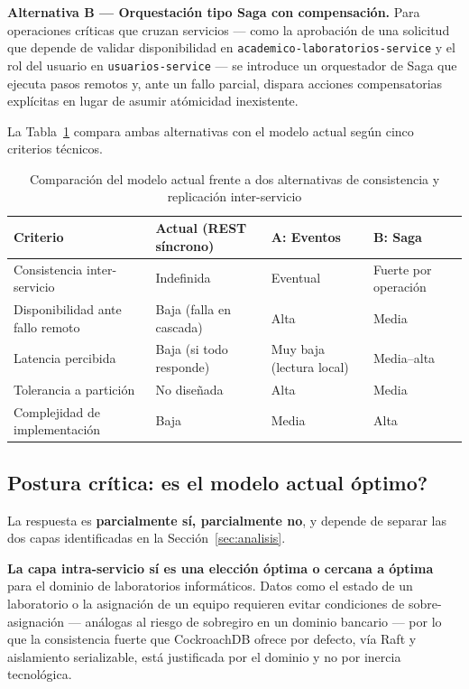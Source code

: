 \documentclass[12pt,letterpaper]{article}
\begin{document}
\textbf{Alternativa B --- Orquestaci\'on tipo Saga con compensaci\'on.}
Para operaciones cr\'iticas que cruzan servicios --- como la aprobaci\'on
de una solicitud que depende de validar disponibilidad en
\texttt{academico-laboratorios-service} y el rol del usuario en
\texttt{usuarios-service} --- se introduce un orquestador de Saga que
ejecuta pasos remotos y, ante un fallo parcial, dispara acciones
compensatorias expl\'icitas en lugar de asumir at\'omicidad inexistente.

La Tabla~\ref{tab:alternativas} compara ambas alternativas con el modelo
actual seg\'un cinco criterios t\'ecnicos.

\begin{table}[h]
\centering
\caption{Comparaci\'on del modelo actual frente a dos alternativas de
consistencia y replicaci\'on inter-servicio}
\label{tab:alternativas}
\small
\begin{tabular}{@{}p{3.1cm}p{3.1cm}p{3.1cm}p{3.1cm}@{}}
\toprule
\textbf{Criterio} & \textbf{Actual (REST s\'incrono)} & \textbf{A: Eventos} & \textbf{B: Saga} \\
\midrule
Consistencia inter-servicio & Indefinida & Eventual & Fuerte por operaci\'on \\
Disponibilidad ante fallo remoto & Baja (falla en cascada) & Alta & Media \\
Latencia percibida & Baja (si todo responde) & Muy baja (lectura local) & Media--alta \\
Tolerancia a partici\'on & No dise\~nada & Alta & Media \\
Complejidad de implementaci\'on & Baja & Media & Alta \\
\bottomrule
\end{tabular}
\end{table}

\subsection{Postura cr\'itica: \textquestiondown es el modelo actual \'optimo?}

La respuesta es \textbf{parcialmente s\'i, parcialmente no}, y depende de
separar las dos capas identificadas en la Secci\'on~\ref{sec:analisis}.

\textbf{La capa intra-servicio s\'i es una elecci\'on \'optima o cercana a
\'optima} para el dominio de laboratorios inform\'aticos. Datos como el
estado de un laboratorio o la asignaci\'on de un equipo requieren evitar
condiciones de sobre-asignaci\'on --- an\'alogas al riesgo de sobregiro en
un dominio bancario --- por lo que la consistencia fuerte que CockroachDB
ofrece por defecto, v\'ia Raft y aislamiento serializable, est\'a
justificada por el dominio y no por inercia tecnol\'ogica.
\end{document}
